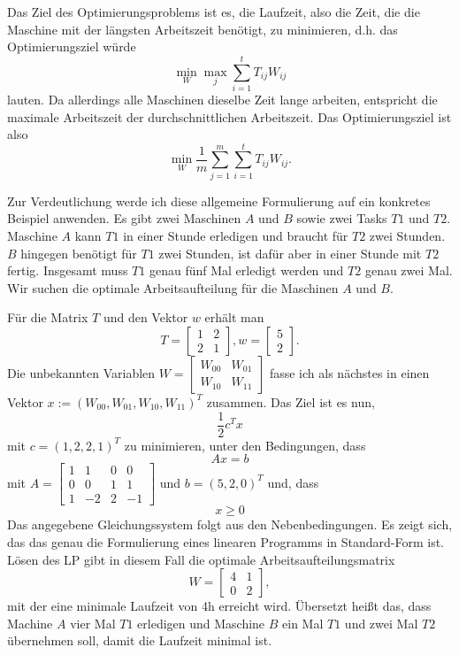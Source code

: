 \documentclass{article}
\begin{document}
Das Ziel des Optimierungsproblems ist es, die Laufzeit, also die Zeit, die die Maschine mit der längsten Arbeitszeit benötigt, zu minimieren, d.h. das Optimierungsziel würde\[
\min_W\max_j\sum\limits_{i=1}^tT_{ij}W_{ij}
\]lauten. Da allerdings alle Maschinen dieselbe Zeit lange arbeiten, entspricht die maximale Arbeitszeit der durchschnittlichen Arbeitszeit. Das Optimierungsziel ist also\[
\min_W\frac1m\sum\limits_{j=1}^m\sum\limits_{i=1}^tT_{ij}W_{ij}.
\]

Zur Verdeutlichung werde ich diese allgemeine Formulierung auf ein konkretes Beispiel anwenden. Es gibt zwei Maschinen \(A\) und \(B\) sowie zwei Tasks \(T1\) und \(T2\). Maschine \(A\) kann \(T1\) in einer Stunde erledigen und braucht für \(T2\) zwei Stunden. \(B\) hingegen benötigt für \(T1\) zwei Stunden, ist dafür aber in einer Stunde mit \(T2\) fertig. Insgesamt muss \(T1\) genau fünf Mal erledigt werden und \(T2\) genau zwei Mal. Wir suchen die optimale Arbeitsaufteilung für die Maschinen \(A\) und \(B\).

Für die Matrix \(T\) und den Vektor \(w\) erhält man\[
T=\begin{bmatrix}
    1&2\\2&1
\end{bmatrix},w=\begin{bmatrix}
    5\\2
\end{bmatrix}.
\]Die unbekannten Variablen \(W=\begin{bmatrix}
    W_{00}&W_{01}\\W_{10}&W_{11}
\end{bmatrix}\) fasse ich als nächstes in einen Vektor \(x:=(W_{00},W_{01},W_{10},W_{11})^T\) zusammen. Das Ziel ist es nun, \[
\frac12c^Tx
\]mit \(c=(1,2,2,1)^T\) zu minimieren, unter den Bedingungen, dass\[
Ax=b
\]mit \(A=\begin{bmatrix}
    1&1&0&0\\0&0&1&1\\1&-2&2&-1
\end{bmatrix}\) und \(b=(5,2,0)^T\) und, dass
\[
x\geq0
\]
Das angegebene Gleichungssystem folgt aus den Nebenbedingungen. Es zeigt sich, das das genau die Formulierung eines linearen Programms in Standard-Form ist. Lösen des LP gibt in diesem Fall die optimale Arbeitsaufteilungsmatrix\[
W=\begin{bmatrix}
    4&1\\0&2
\end{bmatrix},
\]mit der eine minimale Laufzeit von 4h erreicht wird. Übersetzt heißt das, dass Machine \(A\) vier Mal \(T1\) erledigen und Maschine \(B\) ein Mal \(T1\) und zwei Mal \(T2\) übernehmen soll, damit die Laufzeit minimal ist.
\end{document}
